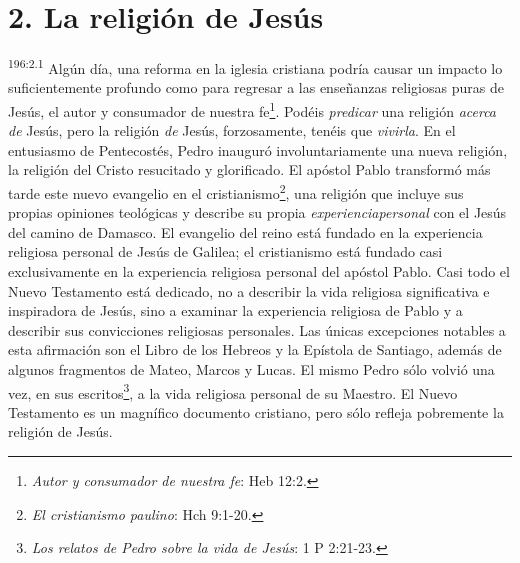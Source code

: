 \section*{2. La religión de Jesús}
\par 
\textsuperscript{196:2.1} Algún día, una reforma en la iglesia cristiana podría causar un impacto lo suficientemente profundo como para regresar a las enseñanzas religiosas puras de Jesús, el autor y consumador de nuestra fe\footnote{\textit{Autor y consumador de nuestra fe}: Heb 12:2.}. Podéis \textit{predicar} una religión \textit{acerca de} Jesús, pero la religión \textit{de} Jesús, forzosamente, tenéis que \textit{vivirla}. En el entusiasmo de Pentecostés, Pedro inauguró involuntariamente una nueva religión, la religión del Cristo resucitado y glorificado. El apóstol Pablo transformó más tarde este nuevo evangelio en el cristianismo\footnote{\textit{El cristianismo paulino}: Hch 9:1-20.}, una religión que incluye sus propias opiniones teológicas y describe su propia \textit{experienciapersonal} con el Jesús del camino de Damasco. El evangelio del reino está fundado en la experiencia religiosa personal de Jesús de Galilea; el cristianismo está fundado casi exclusivamente en la experiencia religiosa personal del apóstol Pablo. Casi todo el Nuevo Testamento está dedicado, no a describir la vida religiosa significativa e inspiradora de Jesús, sino a examinar la experiencia religiosa de Pablo y a describir sus convicciones religiosas personales. Las únicas excepciones notables a esta afirmación son el Libro de los Hebreos y la Epístola de Santiago, además de algunos fragmentos de Mateo, Marcos y Lucas. El mismo Pedro sólo volvió una vez, en sus escritos\footnote{\textit{Los relatos de Pedro sobre la vida de Jesús}: 1 P 2:21-23.}, a la vida religiosa personal de su Maestro. El Nuevo Testamento es un magnífico documento cristiano, pero sólo refleja pobremente la religión de Jesús.


